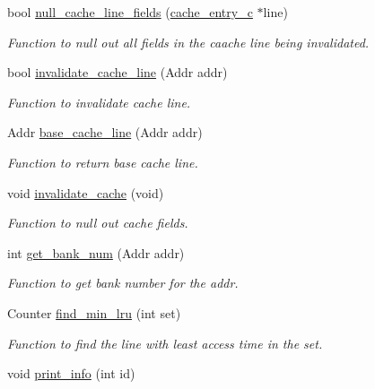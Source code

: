 \begin{DoxyCompactItemize}
\item 
bool \hyperlink{classcache__c_aae28d6130baf524f85a58a8e1f26bf95}{null\_\-cache\_\-line\_\-fields} (\hyperlink{classcache__entry__c}{cache\_\-entry\_\-c} $\ast$line)
\begin{DoxyCompactList}\small\item\em Function to null out all fields in the caache line being invalidated. \item\end{DoxyCompactList}\item 
bool \hyperlink{classcache__c_ac3c3a33a6f436e39352ae35d94fd72ec}{invalidate\_\-cache\_\-line} (Addr addr)
\begin{DoxyCompactList}\small\item\em Function to invalidate cache line. \item\end{DoxyCompactList}\item 
Addr \hyperlink{classcache__c_a05aa7422c71bd2538886dc0d8d1718a4}{base\_\-cache\_\-line} (Addr addr)
\begin{DoxyCompactList}\small\item\em Function to return base cache line. \item\end{DoxyCompactList}\item 
void \hyperlink{classcache__c_a73bda6639c0868419508f20a1956ae81}{invalidate\_\-cache} (void)
\begin{DoxyCompactList}\small\item\em Function to null out cache fields. \item\end{DoxyCompactList}\item 
int \hyperlink{classcache__c_aa104a52d1962e786f7e36fe06e08c7d4}{get\_\-bank\_\-num} (Addr addr)
\begin{DoxyCompactList}\small\item\em Function to get bank number for the addr. \item\end{DoxyCompactList}\item 
Counter \hyperlink{classcache__c_af7987c188d853dbe7ca27edbd26e5819}{find\_\-min\_\-lru} (int set)
\begin{DoxyCompactList}\small\item\em Function to find the line with least access time in the set. \item\end{DoxyCompactList}\item 
void \hyperlink{classcache__c_ad7e41459c6f50c4cd1f3b41cf7b3811e}{print\_\-info} (int id)
\end{DoxyCompactItemize}
